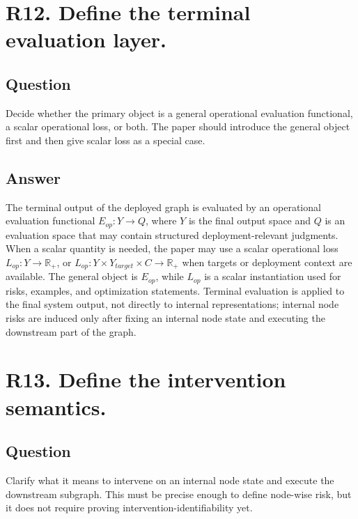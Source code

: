 \documentclass[11pt,a4paper]{article}
\begin{document}
\section*{R12. Define the terminal evaluation layer.}

\subsection*{Question}

Decide whether the primary object is a general operational evaluation functional, a scalar operational loss, or both. The paper should introduce the general object first and then give scalar loss as a special case.

\subsection*{Answer}

The terminal output of the deployed graph is evaluated by an operational evaluation functional \(E_{op}: Y \to Q\), where \(Y\) is the final output space and \(Q\) is an evaluation space that may contain structured deployment-relevant judgments. When a scalar quantity is needed, the paper may use a scalar operational loss \(L_{op}: Y \to \mathbb{R}_+\), or \(L_{op}: Y \times Y_{target} \times C \to \mathbb{R}_+\) when targets or deployment context are available. The general object is \(E_{op}\), while \(L_{op}\) is a scalar instantiation used for risks, examples, and optimization statements. Terminal evaluation is applied to the final system output, not directly to internal representations; internal node risks are induced only after fixing an internal node state and executing the downstream part of the graph.

\section*{R13. Define the intervention semantics.}

\subsection*{Question}

Clarify what it means to intervene on an internal node state and execute the downstream subgraph. This must be precise enough to define node-wise risk, but it does not require proving intervention-identifiability yet.
\end{document}
